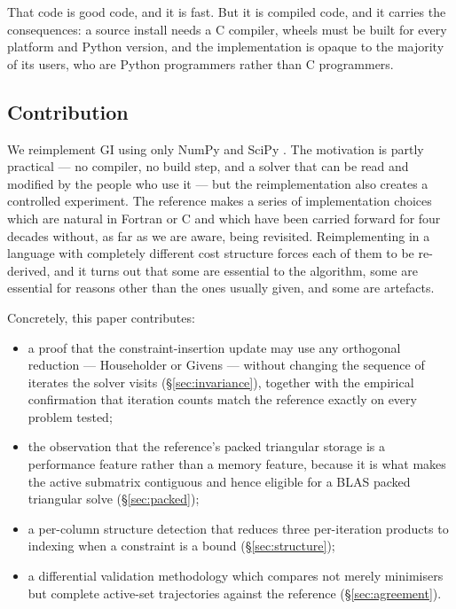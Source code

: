\documentclass[11pt,a4paper]{article}
\theoremstyle{plain}
\theoremstyle{remark}
\begin{document}
That code is good code, and it is fast. But it is compiled code, and it carries
the consequences: a source install needs a C compiler, wheels must be built for
every platform and Python version, and the implementation is opaque to the
majority of its users, who are Python programmers rather than C programmers.

\subsection{Contribution}

We reimplement GI using only NumPy \citep{numpy2020} and SciPy
\citep{scipy2020}. The motivation is partly practical --- no compiler, no build
step, and a solver that can be read and modified by the people who use it --- but
the reimplementation also creates a controlled experiment. The reference makes a
series of implementation choices which are natural in Fortran or C and which have
been carried forward for four decades without, as far as we are aware, being
revisited. Reimplementing in a language with completely different cost structure
forces each of them to be re-derived, and it turns out that some are essential to
the algorithm, some are essential for reasons other than the ones usually given,
and some are artefacts.

Concretely, this paper contributes:
\begin{itemize}[leftmargin=1.4em,itemsep=2pt]
  \item a proof that the constraint-insertion update may use any orthogonal
        reduction --- Householder or Givens --- without changing the sequence of
        iterates the solver visits (\S\ref{sec:invariance}), together with the
        empirical confirmation that iteration counts match the reference exactly
        on every problem tested;
  \item the observation that the reference's packed triangular storage is a
        performance feature rather than a memory feature, because it is what
        makes the active submatrix contiguous and hence eligible for a BLAS
        packed triangular solve (\S\ref{sec:packed});
  \item a per-column structure detection that reduces three per-iteration
        products to indexing when a constraint is a bound (\S\ref{sec:structure});
  \item a differential validation methodology which compares not merely
        minimisers but complete active-set trajectories against the reference
        (\S\ref{sec:agreement}).
\end{itemize}
\end{document}
